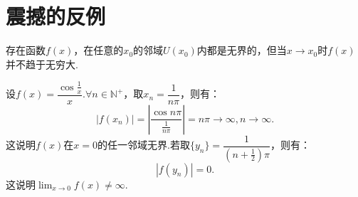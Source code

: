 \section{震撼的反例}

\begin{proposition}
	存在函数$f(x)$，在任意的$x_0$的邻域$U(x_0)$内都是无界的，但当$x\rightarrow x_0$时$f(x)$并不趋于无穷大.
\end{proposition}

\begin{example}
	设$f(x)=\dfrac{\cos{\frac{1}{x}}}{x}$.$\forall n\in\mathbb{N^+}$，取$x_n=\dfrac{1}{n\pi}$，则有：
	\begin{equation}
		|f(x_n)|=\left|\dfrac{\cos{n\pi}}{\frac{1}{n\pi}}\right|=n\pi\rightarrow\infty,n\rightarrow\infty.
	\end{equation}
	这说明$f(x)$在$x=0$的任一邻域无界.若取$\{y_n\}=\dfrac{1}{(n+\frac{1}{2})\pi}$，则有：
	\begin{equation}
		|f(y_n)|=0.
	\end{equation}
	这说明$\displaystyle\lim_{x\to 0}f(x)\neq\infty.$
\end{example}